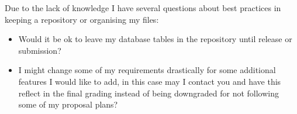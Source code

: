 \documentclass[11pt, a4paper]{article}
\begin{document}
Due to the lack of knowledge I have several questions about best practices in keeping a repository or organising my files:

\begin{itemize}
\item Would it be ok to leave my database tables in the repository until release or submission?
\item I might change some of my requirements drastically for some additional features I would like to add, in this case may I contact you and have this reflect in the final grading instead of being downgraded for not following some of my proposal plans?
\end{itemize}
\end{document}
